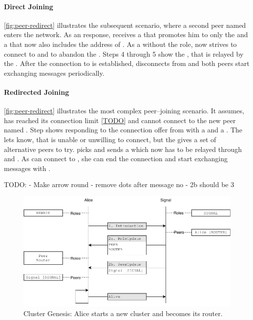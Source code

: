 \paragraph{Direct Joining}
\vref{fig:peer-redirect} illustrates the subsequent scenario, where a second peer named \bob enters the network. As an \introduction response, \bob receives a \roleUpdate that promotes him to only the \peerRole and a \peerUpdate that now also includes the address of \routerRole \alice. As a \peerRole without the \routerRole role, \bob now strives to connect to \alice and to abandon the \signal. Steps 4 through 5 show the \connectionNegotiation, that is relayed by the \signal. After the connection to \alice is established, \bob disconnects from \signal and both peers start exchanging \peerUpdate messages periodically.

\paragraph{Redirected Joining}
\vref{fig:peer-redirect} illustrates the most complex peer–joining scenario. It assumes, \alice has reached its connection limit \ref{TODO} and cannot connect to the new peer named \zoe. Step  shows \alice responding to the connection offer from \zoe with a \rejection and a \peerUpdate. The \rejection lets \zoe know, that \alice is unable or unwilling to connect, but the \peerUpdate gives a set of alternative peers to try. \zoe picks \bob and sends a \connectionNegotiation which now has to be relayed through \signal and \alice. As \bob can connect to \zoe, she can end the \signal connection and start exchanging \peerUpdate messages with \bob.

TODO:
- Make arrow round 
- remove dots after message no
- 2b should be 3
\begin{figure}
\centering
\includegraphics[width=1\textwidth]{graphics/design/genesis.pdf}
\caption{Cluster Genesis: Alice starts a new cluster and becomes its router.}
\label{fig:genesis}
\end{figure}

